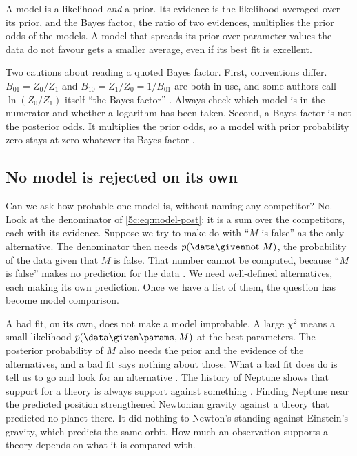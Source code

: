 \begin{keyidea}
A model is a likelihood \emph{and} a prior. Its evidence is the likelihood averaged
over its prior, and the Bayes factor, the ratio of two evidences, multiplies the
prior odds of the models. A model that spreads its prior over parameter values the
data do not favour gets a smaller average, even if its best fit is excellent.
\end{keyidea}

Two cautions about reading a quoted Bayes factor. First, conventions differ.
$B_{01}=Z_0/Z_1$ and $B_{10}=Z_1/Z_0=1/B_{01}$ are both in use, and some authors call
$\ln(Z_0/Z_1)$ itself ``the Bayes factor'' . Always check
which model is in the numerator and whether a logarithm has been taken. Second, a
Bayes factor is not the posterior odds. It multiplies the prior odds, so a model with
prior probability zero stays at zero whatever its Bayes factor
.

\subsection{No model is rejected on its own}
\label{5c:sec:alternatives}

Can we ask how probable one model is, without naming any competitor? No. Look at the
denominator of \eqref{5c:eq:model-post}: it is a sum over the competitors, each with
its evidence. Suppose we try to make do with ``$M$ is false'' as the only alternative.
The denominator then needs $p(\data\given\text{not }M)$, the probability of the data
given that $M$ is false. That number cannot be computed, because ``$M$ is false''
makes no prediction for the data . We need well-defined
alternatives, each making its own prediction. Once we have a list of them, the
question has become model comparison.

A bad fit, on its own, does not make a model improbable. A large $\chi^2$ means a
small likelihood $p(\data\given\params,M)$ at the best parameters. The posterior
probability of $M$ also needs the prior and the evidence of the alternatives, and a
bad fit says nothing about those. What a bad fit does do is tell us to go and look
for an alternative . The history of Neptune shows that support
for a theory is always support against something \cite[\S4.1]{Trotta2008}. Finding
Neptune near the predicted position strengthened Newtonian gravity against a theory
that predicted no planet there. It did nothing to Newton's standing against
Einstein's gravity, which predicts the same orbit. How much an observation supports a
theory depends on what it is compared with.
